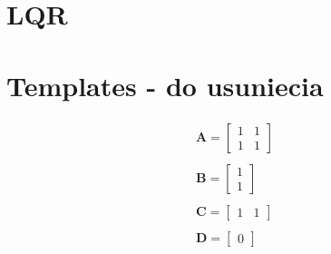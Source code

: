 \documentclass{article}
\begin{document}
\section{LQR}












\section{Templates - do usuniecia}
\begin{equation}\label{eq:standard_ss_template}
 \begin{array}{l}
  \mathbf{A} = \begin{bmatrix}  1 & 1 \\
  							   1 & 1 
  			   \end{bmatrix} \\ \\
  \mathbf{B} = \begin{bmatrix} 1 \\ 1 \end{bmatrix} \\ \\
  \mathbf{C} = \begin{bmatrix} 1 & 1 \end{bmatrix} \\ \\
  \mathbf{D} = \begin{bmatrix} 0 \end{bmatrix} \\
\end{array}
\end{equation}
\end{document}
